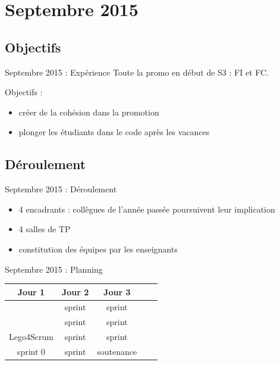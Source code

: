 \documentclass{beamer}
\begin{document}
\section{Septembre 2015}
\subsection{Objectifs}
\begin{frame}{Septembre 2015 : Expérience}
  Toute la promo en début de S3 : FI et FC.

  Objectifs : 
  \begin{itemize}
    \item créer de la cohésion dans la promotion
    \item plonger les étudiants dans le code après les vacances
  \end{itemize}
\end{frame}

\subsection{Déroulement}
\begin{frame}{Septembre 2015 : Déroulement}
  \begin{itemize}
    \item 4 encadrants : collègues de l'année passée poursuivent leur implication
    \item 4 salles de TP
    \item constitution des équipes par les enseignants
  \end{itemize}
\end{frame}

\begin{frame}{Septembre 2015 : Planning}
  \begin{center}
    \begin{tabular}{| c | c | c || c | c |}
      \hline
      \textbf{Jour 1} & \textbf{Jour 2} & \textbf{Jour 3}  \\
      \hline \hline
                      & sprint          & sprint           \\
      \hline
                      & sprint          & sprint           \\
      \hline \hline
      Lego4Scrum      & sprint          & sprint           \\
      \hline
      sprint 0        & sprint          & soutenance       \\
      \hline
    \end{tabular}
  \end{center}
\end{frame}
\end{document}
